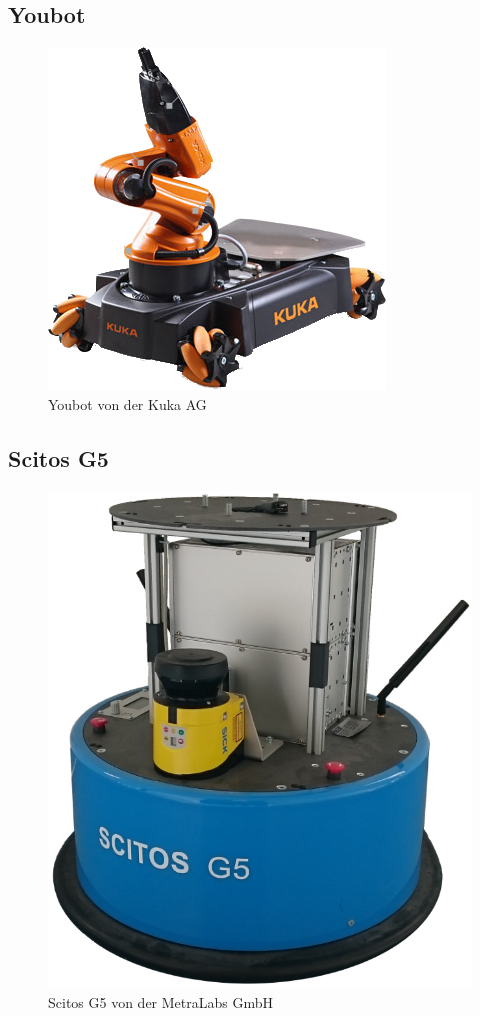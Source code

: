 \subsection{Youbot}
\begin{figure}[H] 
\centering
\includegraphics[scale=0.4]{Bilder/Youbot}
\caption{Youbot von der Kuka AG \cite{You}}
\end{figure}
\subsection{Scitos G5}
\begin{figure}[H] 
\centering
\includegraphics[scale=0.2]{Bilder/Scitos}
\caption{Scitos G5 von der MetraLabs GmbH}
\end{figure}

